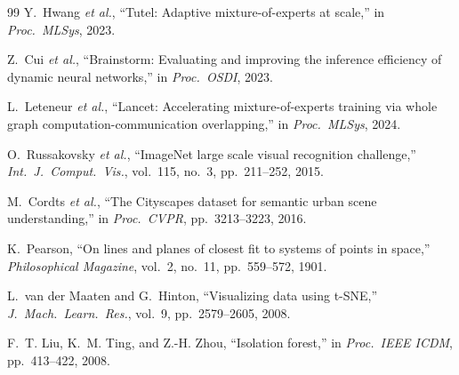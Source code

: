 \documentclass[12pt,a4paper]{article}
\begin{document}
\begin{thebibliography}{99}
Y.~Hwang \emph{et al.}, ``Tutel: Adaptive mixture-of-experts at scale,'' in \emph{Proc.\ MLSys}, 2023.

Z.~Cui \emph{et al.}, ``Brainstorm: Evaluating and improving the inference efficiency of dynamic neural networks,'' in \emph{Proc.\ OSDI}, 2023.

L.~Leteneur \emph{et al.}, ``Lancet: Accelerating mixture-of-experts training via whole graph computation-communication overlapping,'' in \emph{Proc.\ MLSys}, 2024.

O.~Russakovsky \emph{et al.}, ``ImageNet large scale visual recognition challenge,'' \emph{Int.\ J.\ Comput.\ Vis.}, vol.~115, no.~3, pp.~211--252, 2015.

M.~Cordts \emph{et al.}, ``The Cityscapes dataset for semantic urban scene understanding,'' in \emph{Proc.\ CVPR}, pp.~3213--3223, 2016.

K.~Pearson, ``On lines and planes of closest fit to systems of points in space,'' \emph{Philosophical Magazine}, vol.~2, no.~11, pp.~559--572, 1901.

L.~van der Maaten and G.~Hinton, ``Visualizing data using t-SNE,'' \emph{J.\ Mach.\ Learn.\ Res.}, vol.~9, pp.~2579--2605, 2008.

F.~T. Liu, K.~M. Ting, and Z.-H. Zhou, ``Isolation forest,'' in \emph{Proc.\ IEEE ICDM}, pp.~413--422, 2008.

\end{thebibliography}
\end{document}
